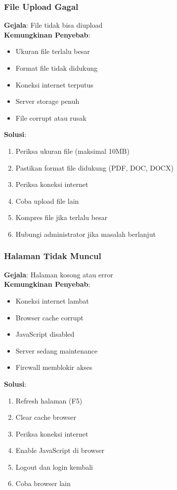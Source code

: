 \documentclass[12pt,a4paper]{article}
\begin{document}
\subsubsection{File Upload Gagal}
\textbf{Gejala}: File tidak bisa diupload\\
\textbf{Kemungkinan Penyebab}:
\begin{itemize}
\item Ukuran file terlalu besar
\item Format file tidak didukung
\item Koneksi internet terputus
\item Server storage penuh
\item File corrupt atau rusak
\end{itemize}
\textbf{Solusi}:
\begin{enumerate}
\item Periksa ukuran file (maksimal 10MB)
\item Pastikan format file didukung (PDF, DOC, DOCX)
\item Periksa koneksi internet
\item Coba upload file lain
\item Kompres file jika terlalu besar
\item Hubungi administrator jika masalah berlanjut
\end{enumerate}

\subsubsection{Halaman Tidak Muncul}
\textbf{Gejala}: Halaman kosong atau error\\
\textbf{Kemungkinan Penyebab}:
\begin{itemize}
\item Koneksi internet lambat
\item Browser cache corrupt
\item JavaScript disabled
\item Server sedang maintenance
\item Firewall memblokir akses
\end{itemize}
\textbf{Solusi}:
\begin{enumerate}
\item Refresh halaman (F5)
\item Clear cache browser
\item Periksa koneksi internet
\item Enable JavaScript di browser
\item Logout dan login kembali
\item Coba browser lain
\end{enumerate}
\end{document}
